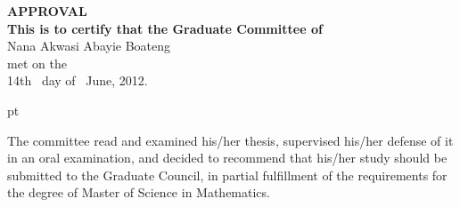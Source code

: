 \documentclass[12pt]{article}
\numberwithin{equation}{subsection} %
\begin{document}
\pagestyle{empty}

\newpage
 \pagestyle{plain}
 \thispagestyle{empty}%

\begin{center}

{\bf APPROVAL} \\ [.05in]
{\bf This is to certify that the Graduate Committee of }\\
Nana  Akwasi Abayie Boateng \\ [-.1in] met on the \\ [-.1in] 14th \
day of \ June, 2012.
\\ [.25in]
\end{center}

 pt

 The committee read and examined his/her thesis,
supervised his/her defense of it in an oral examination, and decided
to recommend that his/her study should be submitted to the Graduate
Council, in partial fulfillment of the requirements for the  degree
of Master of Science in Mathematics.

\vspace{.3in}
\end{document}
